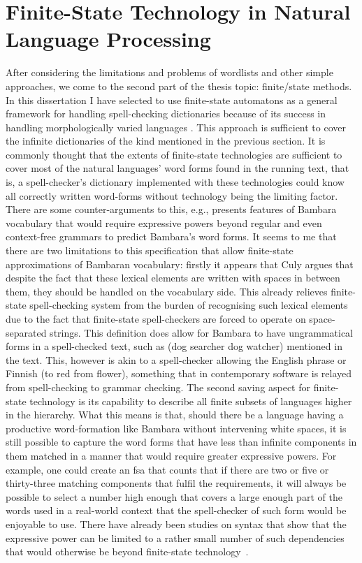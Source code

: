 \documentclass[officiallayout,final]{unihelcompling}
\newcommand\misspelt{\bgroup\markoverwith
{\textcolor{red}{\lower3.5pt\hbox{\sixly \char58}}}\ULon}
\begin{document}
\section{Finite-State Technology in Natural Language Processing}
\label{sec:finite-state-technology-in-nlp}

After considering the limitations and problems of wordlists and other simple
approaches, we come to the second part of the thesis topic: finite\-/state
methods. In this dissertation I have selected to use \glspl{finite-state
automaton} as a general framework for handling spell-checking dictionaries
because of its success in handling morphologically varied
languages \citep{beesley2003finite}. This approach is sufficient to cover
the infinite dictionaries of the kind mentioned in the previous section.  It is
commonly thought that the extents of finite-state technologies are sufficient
to cover most of the natural languages' word forms found in the running text,
that is, a spell-checker's dictionary implemented with these technologies could
know all correctly written word-forms without technology being the limiting
factor. There are some counter-arguments to this, e.g.,
\citet{culy1987complexity} presents features of Bambara vocabulary that would
require expressive powers beyond regular and even context-free grammars to
predict Bambara's word forms. It seems to me that there are two limitations to
this specification that allow finite-state approximations of Bambaran
vocabulary: firstly it appears that Culy argues that despite the fact that
these lexical elements are written with spaces in between them, they should be
handled on the vocabulary side. This already relieves finite-state
spell-checking system from the burden of recognising such lexical elements due
to the fact that finite-state spell-checkers are forced to operate on
space-separated strings.  This definition does allow for Bambara to have
ungrammatical forms in a spell-checked text, such as \misspelt{\emph{wulunyina
o wulufilela}} (dog searcher dog watcher) mentioned in the text. This, however
is akin to a spell-checker allowing the English phrase \misspelt{\emph{I sees
he}} or Finnish \misspelt{\emph{punaiselle kukasta}} (to red from flower),
something that in contemporary software is relayed from spell-checking to
grammar checking. The second saving aspect for finite-state technology is its
capability to describe all finite subsets of languages higher in the hierarchy.
What this means is that, should there be a language having a productive
word-formation like Bambara without intervening white spaces, it is still
possible to capture the word forms that have less than infinite components in
them matched in a manner that would require greater expressive powers. For
example, one could create an \gls{fsa} that counts that if there are two or
five or thirty-three matching components that fulfil the requirements, it will
always be possible to select a number high enough that covers a large enough
part of the words used in a real-world context that the spell-checker of such
form would be enjoyable to use.  There have already been studies on syntax that
show that the expressive power can be limited to a rather small number of such
dependencies that would otherwise be beyond finite-state
technology~\citep{karlsson2007constraints}.
\end{document}

